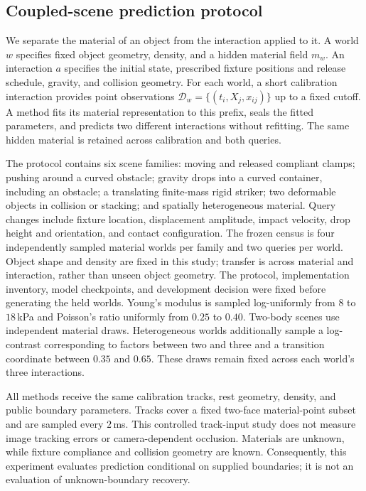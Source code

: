 \subsection{Coupled-scene prediction protocol}
\label{sec:coupled-protocol}
We separate the material of an object from the interaction applied to it.
A world $w$ specifies fixed object geometry, density, and a hidden material
field $m_w$. An interaction $a$ specifies the initial state, prescribed fixture
positions and release schedule, gravity, and collision geometry. For each
world, a short calibration interaction provides point observations
$\mathcal D_w=\{(t_i,X_j,x_{ij})\}$ up to a fixed cutoff. A method fits its
material representation to this prefix, seals the fitted parameters, and
predicts two different interactions without refitting. The same hidden
material is retained across calibration and both queries.

The protocol contains six scene families: moving and released compliant
clamps; pushing around a curved obstacle; gravity drops into a curved
container, including an obstacle; a translating finite-mass rigid striker;
two deformable objects in collision or stacking; and spatially heterogeneous
material. Query changes include fixture location, displacement amplitude,
impact velocity, drop height and orientation, and contact configuration.
The frozen census is four independently sampled material worlds per
family and two queries per world. Object shape and density are fixed in
this study; transfer is across material and interaction, rather than unseen
object geometry.
The protocol, implementation inventory, model checkpoints, and development
decision were fixed before generating the held worlds. Young's modulus is
sampled log-uniformly from $8$ to $18$\,kPa and Poisson's ratio uniformly
from $0.25$ to $0.40$. Two-body scenes use independent material draws.
Heterogeneous worlds additionally sample a log-contrast corresponding to
factors between two and three and a transition coordinate between $0.35$
and $0.65$. These draws remain fixed across each world's three interactions.

All methods receive the same calibration tracks, rest geometry, density,
and public boundary parameters. Tracks cover a fixed two-face material-point
subset and are sampled every $2$\,ms. This controlled track-input study does
not measure image tracking errors or camera-dependent occlusion. Materials
are unknown, while fixture compliance and collision geometry are known.
Consequently, this experiment evaluates prediction conditional on supplied
boundaries; it is not an evaluation of unknown-boundary recovery.

